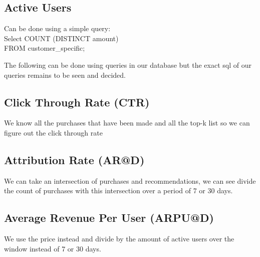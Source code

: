 \documentclass[a4paper,12pt]{article}
\begin{document}
\subsection{Active Users}
Can be done using a simple query: \\
	Select COUNT (DISTINCT amount) \\
	FROM	customer\_specific; 
\vspace{15mm}

The following can be done using queries in our database but the exact sql of our queries remains to be seen and decided.
\subsection{Click Through Rate (CTR)}
We know all the purchases that have been made and all the top-k list so we can figure out the click through rate
\subsection{Attribution Rate (AR@D)} 
We can take an intersection of purchases and recommendations, we can see divide the count of purchases with this intersection over a period of 7 or 30 days.
\subsection{Average Revenue Per User (ARPU@D)}
We use the price instead and divide by the amount of active users over the window instead of 7 or 30 days.
\end{document}
